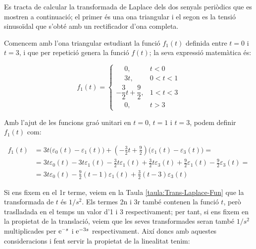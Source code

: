 \begin{exemple}
    Es tracta de calcular la transformada de Laplace dels dos
    senyals periòdics que es mostren a continuació; el primer és una
    ona triangular i el segon es la tensió sinusoïdal que s'obté amb un
    rectificador d'ona completa.

    \begin{center}
        
    \end{center}

    Comencem amb l'ona triangular estudiant la funció $f_1(t)$ definida
    entre $t=0$ i $t=3$, i que per repetició genera la funció $f(t)$; la
    seva expressió matemàtica és:

    \[
        f_1(t) = \begin{cases}
        \phantom{-}0, & t < 0\\
        \phantom{-}3t, & 0<t<1 \\
        -\dfrac{3}{2}t +\dfrac{9}{2}, & 1 < t < 3 \\
        \phantom{-}0, & t > 3 \end{cases}
    \]

    Amb l'ajut de les funcions graó unitari en $t=0$, $t=1$ i $t=3$,
    podem definir $f_1(t)$ com:

    \[\begin{split}
        f_1(t) &= 3t \bigl(\varepsilon_0(t) - \varepsilon_1(t)\bigr) + \left(-\frac{3}{2}t
        +\frac{9}{2}\right) \bigl(\varepsilon_1(t) -
        \varepsilon_3(t)\bigr) = \\
        &=
        3t\varepsilon_0(t)-3t\varepsilon_1(t)-\frac{3}{2}t \varepsilon_1(t)
        +\frac{3}{2}t \varepsilon_3(t) +\frac{9}{2} \varepsilon_1(t)
        -\frac{9}{2} \varepsilon_3(t) = \\
        &=3t\varepsilon_0(t) -\frac{9}{2}(t-1)\varepsilon_1(t) +
        \frac{3}{2}(t-3)\varepsilon_3(t)
    \end{split}\]

    Si ens fixem en el 1r terme, veiem en la Taula
    \vref{taula:Trans-Laplace-Fun} que la  transformada de $t$ és $1/s^2$.
    Els termes 2n i 3r també contenen la funció $t$, però traslladada
    en el temps un valor d'1 i 3 respectivament; per tant, si ens fixem
    en la propietat de la translació, veiem que les seves transformades
    seran també $1/s^2$ multiplicades per $\mathrm{e}^{-s}$ i $\mathrm{e}^{-3s}$
    respectivament. Així doncs amb aquestes consideracions i fent
    servir la propietat de la linealitat tenim:


\end{exemple}
